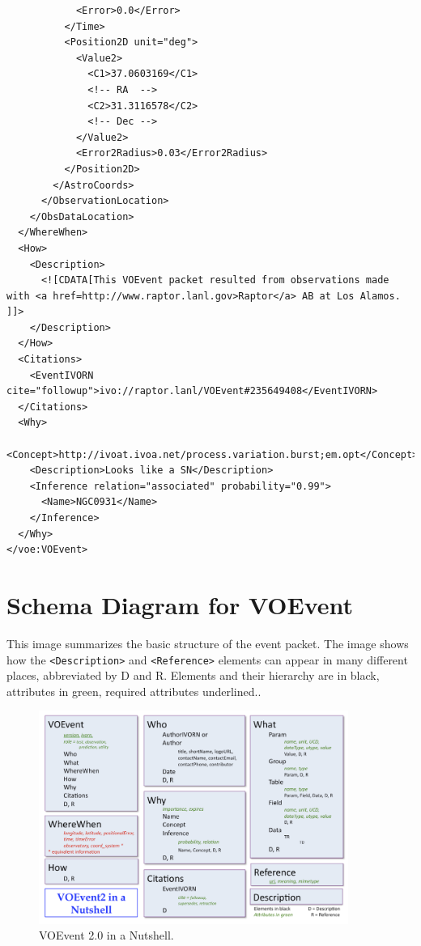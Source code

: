 \documentclass[11pt,a4paper]{ivoa}
\begin{document}
{\begin{verbatim}
            <Error>0.0</Error>
          </Time>
          <Position2D unit="deg">
            <Value2>
              <C1>37.0603169</C1>
              <!-- RA  -->
              <C2>31.3116578</C2>
              <!-- Dec -->
            </Value2>
            <Error2Radius>0.03</Error2Radius>
          </Position2D>
        </AstroCoords>
      </ObservationLocation>
    </ObsDataLocation>
  </WhereWhen>
  <How>
    <Description>
      <![CDATA[This VOEvent packet resulted from observations made with <a href=http://www.raptor.lanl.gov>Raptor</a> AB at Los Alamos. ]]>
    </Description>
  </How>
  <Citations>
    <EventIVORN cite="followup">ivo://raptor.lanl/VOEvent#235649408</EventIVORN>
  </Citations>
  <Why>
    <Concept>http://ivoat.ivoa.net/process.variation.burst;em.opt</Concept>
    <Description>Looks like a SN</Description>
    <Inference relation="associated" probability="0.99">
      <Name>NGC0931</Name>
    </Inference>
  </Why>
</voe:VOEvent>
\end{verbatim}}

\section{Schema Diagram for VOEvent}
\label{sec:5}
This image summarizes the basic structure of the event packet. The image shows how the {\tt <Description>} and {\tt <Reference>} elements can appear in many different places, abbreviated by D and R. Elements and their hierarchy are in black, attributes in green, required attributes underlined.. 
\begin{figure}[th]
\begin{center}
\includegraphics[width=0.9\textwidth]{nutshell.png} \end{center}
\caption{VOEvent 2.0 in a Nutshell.}
\label{fig:nutshell}
\end{figure}
\end{document}
